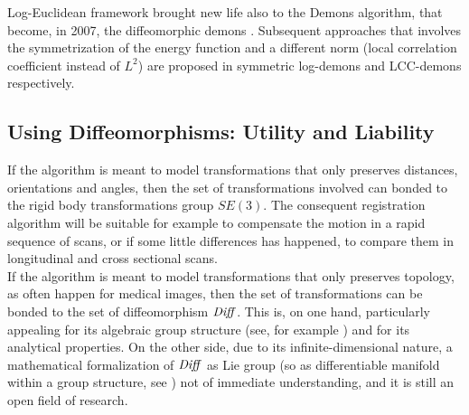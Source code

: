\begin{enumerate}
	Log-Euclidean framework brought new life also to the Demons algorithm, that  become, in 2007, the diffeomorphic demons \cite{vercauteren2007non}.
	Subsequent approaches that involves the symmetrization of the energy function and a different norm (local correlation coefficient instead of $L^{2}$) are proposed in symmetric log-demons \cite{vercauteren08} and LCC-demons \cite{lorenzi2013lcc} respectively.
	
\end{enumerate}


\subsection{Using Diffeomorphisms: Utility and Liability}\label{se:diffe_util_and_liab}

If the algorithm is meant to model transformations that only preserves distances, orientations and angles, then the set of transformations involved can bonded to the rigid body transformations group $SE(3)$. The consequent registration algorithm will be suitable for example to compensate the motion in a rapid sequence of scans, or if some little differences has happened, to compare them in longitudinal and cross sectional scans.\\
If the algorithm is meant to model transformations that only preserves topology, as often happen for medical images, then the set of transformations can be bonded to the set of diffeomorphism $\text{\emph{Diff}}$. This is, on one hand, particularly appealing for its algebraic group structure (see, for example \cite{artin2011algebra}) and for its analytical properties. On the other side, due to its infinite-dimensional nature, a mathematical formalization of $\text{\emph{Diff}}$ as Lie group (so as differentiable manifold within a group structure, see \cite{warner}) not of immediate understanding, and it is still an open field of research.\\

